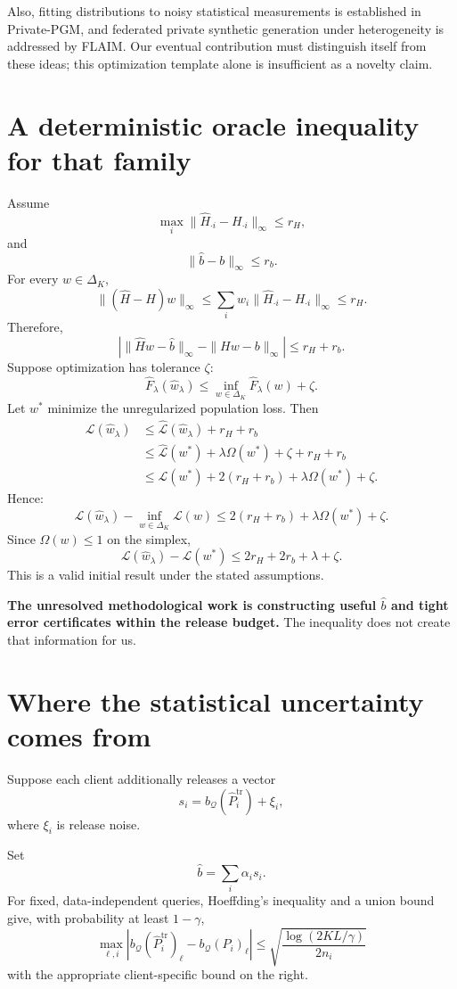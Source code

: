 \documentclass[11pt,a4paper]{article}
\begin{document}
Also, fitting distributions to noisy statistical measurements is established in Private-PGM, and federated private synthetic generation under heterogeneity is addressed by FLAIM. Our eventual contribution must distinguish itself from these ideas; this optimization template alone is insufficient as a novelty claim.\cite{privatepgm,flaim}

\section{A deterministic oracle inequality for that family}
Assume
\[
\max_i\|\widehat H_{\cdot i}-H_{\cdot i}\|_\infty\leq r_H,
\]
and
\[
\|\widehat b-b\|_\infty\leq r_b.
\]
For every $w\in\Delta_K$,
\[
\|(\widehat H-H)w\|_\infty\leq
\sum_iw_i\|\widehat H_{\cdot i}-H_{\cdot i}\|_\infty\leq r_H.
\]
Therefore,
\[
\boxed{\left|\|\widehat H w-\widehat b\|_\infty-\|Hw-b\|_\infty\right|
\leq r_H+r_b.}
\]
Suppose optimization has tolerance $\zeta$:
\[
\widehat F_\lambda(\widehat w_\lambda)\leq
\inf_{w\in\Delta_K}\widehat F_\lambda(w)+\zeta.
\]
Let $w^*$ minimize the unregularized population loss. Then
\[
\begin{aligned}
\mathcal L(\widehat w_\lambda)
&\leq\widehat{\mathcal L}(\widehat w_\lambda)+r_H+r_b\\
&\leq\widehat{\mathcal L}(w^*)+\lambda\Omega(w^*)+\zeta+r_H+r_b\\
&\leq\mathcal L(w^*)+2(r_H+r_b)+\lambda\Omega(w^*)+\zeta.
\end{aligned}
\]
Hence:
\[
\boxed{\mathcal L(\widehat w_\lambda)-\inf_{w\in\Delta_K}\mathcal L(w)
\leq2(r_H+r_b)+\lambda\Omega(w^*)+\zeta.}
\]
Since $\Omega(w)\leq1$ on the simplex,
\[
\boxed{\mathcal L(\widehat w_\lambda)-\mathcal L(w^*)
\leq2r_H+2r_b+\lambda+\zeta.}
\]
This is a valid initial result under the stated assumptions.

\textbf{The unresolved methodological work is constructing useful $\widehat b$ and tight error certificates within the release budget.} The inequality does not create that information for us.

\section{Where the statistical uncertainty comes from}
Suppose each client additionally releases a vector
\[
s_i=b_{\mathcal Q}(\widehat P_i^{\mathrm{tr}})+\xi_i,
\]
where $\xi_i$ is release noise.

Set
\[
\widehat b=\sum_i\alpha_i s_i.
\]
For fixed, data-independent queries, Hoeffding's inequality and a union bound give, with probability at least $1-\gamma$,
\[
\max_{\ell,i}\left|
b_{\mathcal Q}(\widehat P_i^{\mathrm{tr}})_\ell-b_{\mathcal Q}(P_i)_\ell
\right|\leq\sqrt{\frac{\log(2KL/\gamma)}{2n_i}}
\]
with the appropriate client-specific bound on the right.
\end{document}
